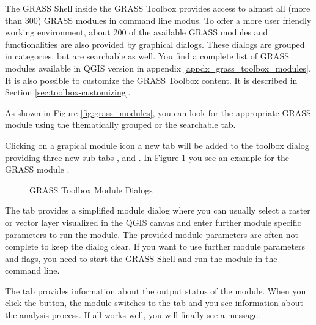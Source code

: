 The GRASS Shell inside the GRASS Toolbox provides access to almost all (more 
than 300) GRASS modules in command line modus. To offer a more user
friendly working environment, about 200 of the available GRASS modules and 
functionalities are also provided by graphical dialogs. These dialogs are 
grouped in categories, but are searchable as well. You find a complete 
list of GRASS modules available in QGIS version \CURRENT
in appendix \ref{appdx_grass_toolbox_modules}. It is also possible to 
customize the GRASS Toolbox content. It is described in Section 
\ref{sec:toolbox-customizing}.

As shown in Figure \ref{fig:grass_modules}, you can look for the appropriate 
GRASS module using the thematically grouped  or the 
searchable  tab. 

Clicking on a grapical module icon a new tab will be added to the toolbox 
dialog providing three new sub-tabs ,  and 
. In Figure \ref{fig:grass_module_dialog} you see an example 
for the GRASS module .

\begin{figure}[h]
\centering
   \hspace{1cm}
   \hspace{1cm}
\caption{GRASS Toolbox Module Dialogs \nixcaption}\label{fig:grass_module_dialog}
\end{figure}


The  tab provides a simplified module dialog where you can 
usually select a raster or vector layer visualized in the QGIS canvas and 
enter further module specific parameters to run the module. The provided 
module parameters are often not complete to keep the dialog clear. If you want 
to use further module parameters and flags, you need to start the GRASS Shell 
and run the module in the command line.


The  tab provides information about the output status of the 
module. When you click the  button, the module switches to the 
 tab and you see information about the analysis process. If all 
works well, you will finally see a  message.

